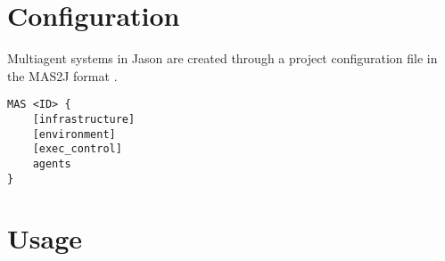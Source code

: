 \documentclass[a4paper]{report}
\begin{document}
\chapter{Configuration}

Multiagent systems in Jason are created through a project configuration file in
the MAS2J format \cite{Bordini2007}. 

\begin{verbatim}
MAS <ID> {
    [infrastructure]
    [environment]
    [exec_control]
    agents
} 
\end{verbatim}

\chapter{Usage}



\end{document}
